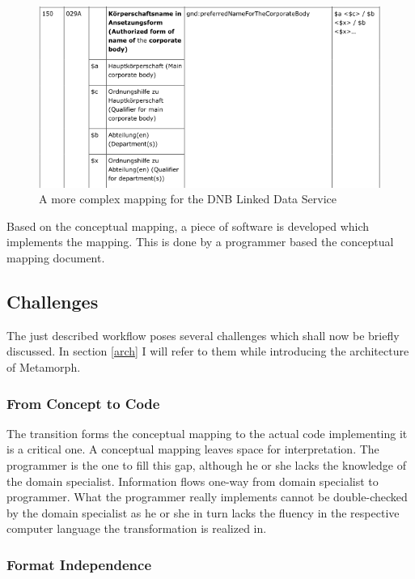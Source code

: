 \documentclass[12pt,a4paper]{article}
\begin{document}
\begin{figure}[htp]
\centering
\includegraphics[width=.8\textwidth]{figures/mapping_complex}
\caption{A more complex mapping for the DNB Linked Data Service}\label{fig:mapping_complex}
\end{figure}



Based on the conceptual mapping, a piece of software is developed which implements the mapping. This is done by a programmer based the conceptual mapping document.



\subsection{Challenges}

The just described workflow poses several challenges which shall now be briefly discussed. In section \ref{arch} I will refer to them while introducing the architecture of Metamorph.

\subsubsection{From Concept to Code}

The transition forms the conceptual mapping to the actual code implementing it is a critical one. A conceptual mapping leaves space for interpretation. The programmer is the one to fill this gap, although he or she lacks the knowledge of the domain specialist.
Information flows one-way from domain specialist to programmer. What the programmer really implements cannot be double-checked by the domain specialist as he or she in turn lacks the fluency in the respective computer language the transformation is realized in.


\subsubsection{Format Independence}\label{format_ind}
\end{document}
